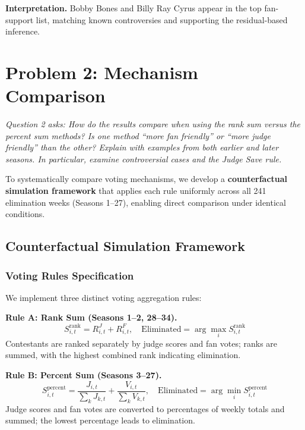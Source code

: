 \documentclass{mcmthesis}
\begin{document}
\textbf{Interpretation.} Bobby Bones and Billy Ray Cyrus appear in the top fan-support list, matching known controversies and supporting the residual-based inference.


\section{Problem 2: Mechanism Comparison}

\textit{Question 2 asks: How do the results compare when using the rank sum versus the percent sum methods? Is one method ``more fan friendly'' or ``more judge friendly'' than the other? Explain with examples from both earlier and later seasons. In particular, examine controversial cases and the Judge Save rule.}

To systematically compare voting mechanisms, we develop a \textbf{counterfactual simulation framework} that applies each rule uniformly across all 241 elimination weeks (Seasons 1--27), enabling direct comparison under identical conditions.

\subsection{Counterfactual Simulation Framework}

\subsubsection{Voting Rules Specification}

We implement three distinct voting aggregation rules:

\textbf{Rule A: Rank Sum (Seasons 1--2, 28--34).}
\begin{equation}
S^{\text{rank}}_{i,t} = R^{J}_{i,t} + R^{F}_{i,t}, \quad \text{Eliminated} = \arg\max_i S^{\text{rank}}_{i,t}
\end{equation}
Contestants are ranked separately by judge scores and fan votes; ranks are summed, with the highest combined rank indicating elimination.

\textbf{Rule B: Percent Sum (Seasons 3--27).}
\begin{equation}
S^{\text{percent}}_{i,t} = \frac{J_{i,t}}{\sum_k J_{k,t}} + \frac{V_{i,t}}{\sum_k V_{k,t}}, \quad \text{Eliminated} = \arg\min_i S^{\text{percent}}_{i,t}
\end{equation}
Judge scores and fan votes are converted to percentages of weekly totals and summed; the lowest percentage leads to elimination.
\end{document}
